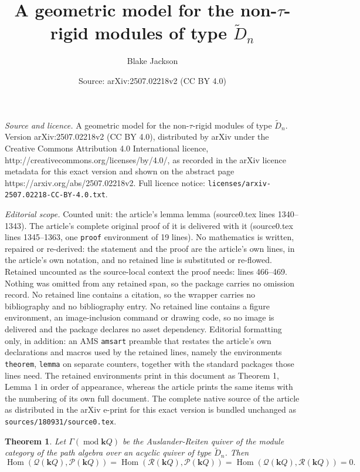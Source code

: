 \documentclass[10pt,a4paper]{amsart}
\title{A geometric model for the non-$\tau$-rigid modules of type $\widetilde{D}_n$}
\author{Blake Jackson}
\date{Source: arXiv:2507.02218v2 (CC BY 4.0)}
\newtheorem{theorem}{Theorem}
\newcommand{\Hom}{\operatorname{Hom}}
\renewcommand{\k}{\mathbf{k}}
\renewcommand{\mod}{\operatorname{mod}}
\begin{document}
\maketitle

\noindent\emph{Source and licence.} A geometric model for the non-$\tau$-rigid modules of type $\widetilde{D}_n$. Version arXiv:2507.02218v2 (CC BY 4.0), distributed by arXiv under the Creative Commons Attribution 4.0 International licence, http://creativecommons.org/licenses/by/4.0/, as recorded in the arXiv licence metadata for this exact version and shown on the abstract page https://arxiv.org/abs/2507.02218v2. Full licence notice: \texttt{licenses/arxiv-2507.02218-CC-BY-4.0.txt}.\par\smallskip

\noindent\textit{Editorial scope.} Counted unit: the article's lemma lemma (source0.tex lines 1340--1343). The article's complete original proof of it is delivered with it (source0.tex lines 1345--1363, one \texttt{proof} environment of 19 lines). No mathematics is written, repaired or re-derived: the statement and the proof are the article's own lines, in the article's own notation, and no retained line is substituted or re-flowed.  Retained uncounted as the source-local context the proof needs: lines 466--469.  Nothing was omitted from any retained span, so the package carries no omission record.  No retained line contains a citation, so the wrapper carries no bibliography and no bibliography entry.  No retained line contains a figure environment, an image-inclusion command or drawing code, so no image is delivered and the package declares no asset dependency.  Editorial formatting only, in addition: an AMS \texttt{amsart} preamble that restates the article's own declarations and macros used by the retained lines, namely the environments \texttt{theorem}, \texttt{lemma} on separate counters, together with the standard packages those lines need.  The retained environments print in this document as Theorem 1, Lemma 1 in order of appearance, whereas the article prints the same items with the numbering of its own full document.  The complete native source of the article as distributed in the arXiv e-print for this exact version is bundled unchanged as \texttt{sources/180931/source0.tex}.
\begin{theorem}\label{thm-0-homs}
    Let $\Gamma(\mod \k Q )$ be the Auslander-Reiten quiver of the module category of the path algebra over an acyclic quiver of type $\widetilde{D}_n$. 
    Then \[ \Hom (\mathcal{Q}(\k Q) ,\mathcal{P}(\k Q)) = \Hom (\mathcal{R}(\k Q) ,\mathcal{P}(\k Q)) = \Hom (\mathcal{Q}(\k Q) ,\mathcal{R}(\k Q)) = 0. \]
\end{theorem}
\end{document}
